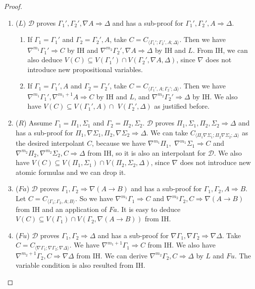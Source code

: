 \begin{proof}
\begin{enumerate}
		\item ($L$) $\mathcal{D}$ proves $\Gamma_1' , \Gamma_2' , \nabla A \Rightarrow \Delta$ and has a sub-proof for $\Gamma_1' , \Gamma_2' , A \Rightarrow \Delta$.
		\begin{enumerate}
			\item If $\Gamma_1 = \Gamma_1'$ and $\Gamma_2 = \Gamma_2' , A$, take $C = C_{\langle\Gamma_1';\Gamma_2',A;\Delta\rangle}$. Then we have $\nabla^{m_1} \Gamma_1' \Rightarrow C$ by IH and $\nabla^{m_2}\Gamma_2' , \nabla A \Rightarrow \Delta$ by IH and $L$. From IH, we can also deduce $V(C) \subseteq V(\Gamma_1') \cap V(\Gamma_2',\nabla A,\Delta)$, since $\nabla$ does not introduce new propositional variables.
			
			\item If $\Gamma_1 = \Gamma_1' , A$ and $\Gamma_2 = \Gamma_2'$, take $C = C_{\langle\Gamma_1',A;\Gamma_2';\Delta\rangle}$. Then we have $\nabla^{m_1}\Gamma_1', \nabla^{m_1+1}A \Rightarrow C$ by IH and $L$, and $\nabla^{m_2}\Gamma_2' \Rightarrow \Delta$ by IH. We also have $V(C) \subseteq V(\Gamma_1',A) \cap$ $V(\Gamma_2',\Delta)$ as justified before.
		\end{enumerate}

		\item ($R$) Assume $\Gamma_1 = \Pi_1, \Sigma_1$ and $\Gamma_2 = \Pi_2, \Sigma_2$. $\mathcal{D}$ proves $\Pi_1, \Sigma_1, \Pi_2, \Sigma_2 \Rightarrow \Delta$ and has a sub-proof for $\Pi_1, \nabla\Sigma_1, \Pi_2, \nabla\Sigma_2 \Rightarrow \Delta$.
		We can take $C_{\langle\Pi_1\nabla\Sigma_1;\Pi_2\nabla\Sigma_2;\Delta\rangle}$ as the desired interpolant $C$, because we have $\nabla^{m_1}\Pi_1,$ $\nabla^{m_1}\Sigma_1 \Rightarrow C$ and $\nabla^{m_2}\Pi_2, \nabla^{m_2}\Sigma_2, C \Rightarrow \Delta$ from IH, so it is also an interpolant for $\mathcal{D}$. We also have $V(C) \subseteq V(\Pi_1,\Sigma_1) \cap V(\Pi_2,\Sigma_2,\Delta)$, since $\nabla$ does not introduce new atomic formulas and we can drop it.

		\item ($Fa$) $\mathcal{D}$ proves $\Gamma_1 , \Gamma_2 \Rightarrow \nabla(A \rightarrow B)$ and has a sub-proof for $\Gamma_1 , \Gamma_2 , A \Rightarrow B$. Let $C = C_{\langle\Gamma_1;\Gamma_2,A;B\rangle}$. So we have $\nabla^{m_1}\Gamma_1 \Rightarrow C$ and $\nabla^{m_2}\Gamma_2 , C \Rightarrow \nabla (A \rightarrow B)$ from IH and an application of $Fa$.
		It is easy to deduce $V(C) \subseteq V(\Gamma_1) \cap V(\Gamma_2 , \nabla (A \rightarrow B))$ from IH.

		\item ($Fu$) $\mathcal{D}$ proves $\Gamma_1, \Gamma_2 \Rightarrow \Delta$ and has a sub-proof for $\nabla \Gamma_1, \nabla \Gamma_2 \Rightarrow \nabla \Delta$. Take $C = C_{\langle\nabla\Gamma_1;\nabla\Gamma_2;\nabla\Delta\rangle}$. We have $\nabla^{m_1+1}\Gamma_1 \Rightarrow C$ from IH. We also have $\nabla^{m_2+1} \Gamma_2, C \Rightarrow \nabla \Delta$ from IH. We can derive $\nabla^{m_2} \Gamma_2, C \Rightarrow \Delta$ by $L$ and $Fu$. The variable condition is also resulted from IH.
	\end{enumerate}
\end{proof}

